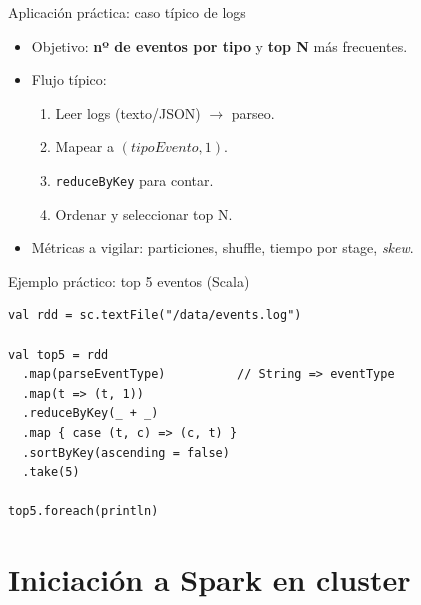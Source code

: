 \documentclass{beamer}
\begin{document}
\begin{frame}{Aplicación práctica: caso típico de logs}
\begin{itemize}
  \item Objetivo: \textbf{nº de eventos por tipo} y \textbf{top N} más frecuentes.
  \item Flujo típico:
  \begin{enumerate}
    \item Leer logs (texto/JSON) \(\rightarrow\) parseo.
    \item Mapear a \((tipoEvento, 1)\).
    \item \texttt{reduceByKey} para contar.
    \item Ordenar y seleccionar top N.
  \end{enumerate}
  \item Métricas a vigilar: particiones, shuffle, tiempo por stage, \emph{skew}.
\end{itemize}
\end{frame}

\begin{frame}[fragile]{Ejemplo práctico: top 5 eventos (Scala)}
\begin{verbatim}
val rdd = sc.textFile("/data/events.log")

val top5 = rdd
  .map(parseEventType)          // String => eventType
  .map(t => (t, 1))
  .reduceByKey(_ + _)
  .map { case (t, c) => (c, t) }
  .sortByKey(ascending = false)
  .take(5)

top5.foreach(println)
\end{verbatim}
\end{frame}

\section{Iniciación a Spark en cluster}
\end{document}
